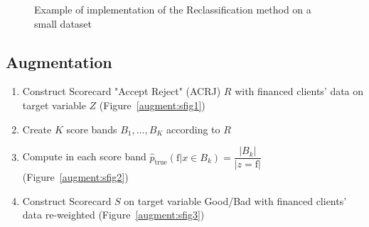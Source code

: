 \begin{figure}
{\begin{multicols}{3}
\end{multicols}
}
\caption{Example of implementation of the Reclassification method on a small dataset}
\label{reclassexample}
\end{figure}


\subsection{Augmentation} \label{augmentation}

\begin{enumerate}
\item Construct Scorecard "Accept Reject" (ACRJ) $R$ with financed clients' data on target variable $Z$ (Figure~\ref{augment:sfig1})
\item Create $K$ score bands $B_1, \ldots, B_K$ according to $R$
\item Compute in each score band $\hat{p}_{\text{true}}(\text{f}|x \in B_k) = \dfrac{|B_k|}{|z=\text{f}|}$ (Figure~\ref{augment:sfig2})
\item Construct Scorecard $S$ on target variable Good/Bad with financed clients' data re-weighted (Figure~\ref{augment:sfig3})
\end{enumerate}


